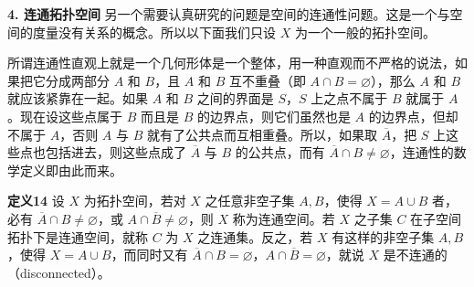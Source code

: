 
\noindent\textbf{4. 连通拓扑空间}\quad
另一个需要认真研究的问题是空间的连通性问题。这是一个与空间的度量没有关系的概念。所以以下面我们只设 $X$ 为一个一般的拓扑空间。

所谓连通性直观上就是一个几何形体是一个整体，用一种直观而不严格的说法，如果把它分成两部分 $A$ 和 $B$，且 $A$ 和 $B$ 互不重叠（即 $A\cap B=\varnothing$），那么 $A$ 和 $B$ 就应该紧靠在一起。如果 $A$ 和 $B$ 之间的界面是 $S$，$S$ 上之点不属于 $B$ 就属于 $A$。现在设这些点属于 $B$ 而且是 $B$ 的边界点，则它们虽然也是 $A$ 的边界点，但却不属于 $A$，否则 $A$ 与 $B$ 就有了公共点而互相重叠。所以，如果取 $\overline A$，把 $S$ 上这些点也包括进去，则这些点成了 $\overline A$ 与 $B$ 的公共点，而有 $\overline A\cap B\ne\varnothing$，连通性的数学定义即由此而来。

\noindent\textbf{定义14}\quad
设 $X$ 为拓扑空间，若对 $X$ 之任意非空子集 $A,B$，使得 $X=A\cup B$ 者，必有 $\overline A\cap B\ne\varnothing$，或 $A\cap\overline B\ne\varnothing$，则 $X$ 称为连通空间。若 $X$ 之子集 $C$ 在子空间拓扑下是连通空间，就称 $C$ 为 $X$ 之连通集。反之，若 $X$ 有这样的非空子集 $A,B$，使得 $X=A\cup B$，而同时又有 $\overline A\cap B=\varnothing$，$A\cap\overline B=\varnothing$，就说 $X$ 是不连通的（disconnected）。


